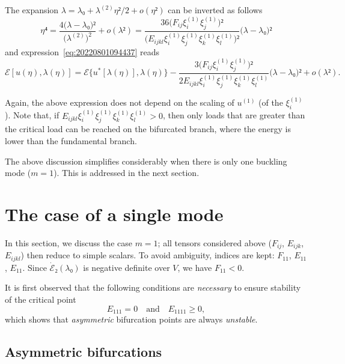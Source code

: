 \documentclass[12pt, final]{scrartcl}
\theoremstyle{definition}
\newcommand{\E}{\mathcal E}
\newcommand{\order}[2][1]{#2^{(#1)}}
\begin{document}
The expansion $\lambda = \lambda₀ + \order[2]\lambda η² / 2 + o(η²)$ can be inverted as follows
\begin{equation}
  η⁴ = \frac{4 \bigl(\lambda - \lambda₀\bigr)²}{\bigl( \order[2]\lambda \bigr)^2} + o(\lambda²) = \frac{36 \bigl( F_{ij} \order[1]{ξ_i} \order[1]{ξ_j} \bigr)²}{\bigl( E_{ijkl} \order[1]{ξ_i} \order[1]{ξ_j} \order[1]{ξ_k} \order[1]{ξ_l} \bigr)²} \bigl( \lambda - \lambda₀ \bigr)²
\end{equation}
and expression~\eqref{eq:20220801094437} reads
\begin{equation}
  \E[u(η), \lambda(η)] = \E\{u^{\ast}[\lambda(η)], \lambda(η)\} - \frac{3 \bigl( F_{ij} \order[1]{ξ_i} \order[1]{ξ_j} \bigr)²}{2 E_{ijkl} \order[1]{ξ_i} \order[1]{ξ_j} \order[1]{ξ_k} \order[1]{ξ_l} } \bigl( \lambda - \lambda₀ \bigr)²  + o(\lambda²).
\end{equation}

Again, the above expression does not depend on the scaling of $\order[1]u$ (of the
$\order[1]{ξ_i}$). Note that, if $E_{ijkl} \order[1]{ξ_i} \order[1]{ξ_j} \order[1]{ξ_k} \order[1]{ξ_l} > 0$, then only loads
that are greater than the critical load can be reached on the bifurcated branch,
where the energy is lower than the fundamental branch.

\medskip

The above discussion simplifies considerably when there is only one buckling
mode ($m = 1$). This is addressed in the next section.

\section{The case of a single mode}

In this section, we discuss the case $m = 1$; all tensors considered above
($F_{ij}$, $E_{ijk}$, $E_{ijkl}$) then reduce to simple scalars. To avoid
ambiguity, indices are kept: $F_{11}$, $E_{11}$, $E_{11}$. Since
$\dot{\E}₂(\lambda₀)$ is negative definite over $V$, we have $F_{11} < 0$.

It is first observed that the following conditions are \emph{necessary} to
ensure stability of the critical point
\begin{equation}
  E_{111} = 0 \quad \text{and} \quad E_{1111} ≥ 0,
\end{equation}
which shows that \emph{asymmetric} bifurcation points are always
\emph{unstable}.

\subsection{Asymmetric bifurcations}
\end{document}
